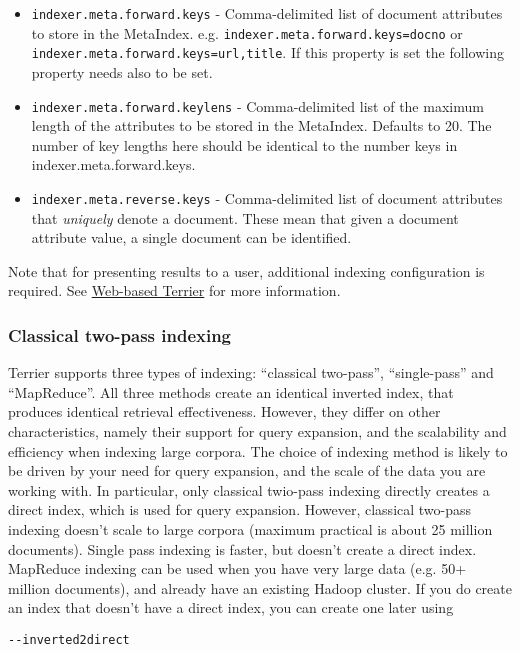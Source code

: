 \begin{itemize}
\tightlist
\item
  \texttt{indexer.meta.forward.keys} - Comma-delimited list of document
  attributes to store in the MetaIndex. e.g.
  \texttt{indexer.meta.forward.keys=docno} or
  \texttt{indexer.meta.forward.keys=url,title}. If this property is set
  the following property needs also to be set.
\item
  \texttt{indexer.meta.forward.keylens} - Comma-delimited list of the
  maximum length of the attributes to be stored in the MetaIndex.
  Defaults to 20. The number of key lengths here should be identical to
  the number keys in indexer.meta.forward.keys.
\item
  \texttt{indexer.meta.reverse.keys} - Comma-delimited list of document
  attributes that \emph{uniquely} denote a document. These mean that
  given a document attribute value, a single document can be identified.
\end{itemize}

Note that for presenting results to a user, additional indexing
configuration is required. See \href{terrier_http.html}{Web-based
Terrier} for more information.

\subsubsection{Classical two-pass
indexing}\label{classical-two-pass-indexing}

Terrier supports three types of indexing: ``classical two-pass'',
``single-pass'' and ``MapReduce''. All three methods create an identical
inverted index, that produces identical retrieval effectiveness.
However, they differ on other characteristics, namely their support for
query expansion, and the scalability and efficiency when indexing large
corpora. The choice of indexing method is likely to be driven by your
need for query expansion, and the scale of the data you are working
with. In particular, only classical twio-pass indexing directly creates
a direct index, which is used for query expansion. However, classical
two-pass indexing doesn't scale to large corpora (maximum practical is
about 25 million documents). Single pass indexing is faster, but doesn't
create a direct index. MapReduce indexing can be used when you have very
large data (e.g. 50+ million documents), and already have an existing
Hadoop cluster. If you do create an index that doesn't have a direct
index, you can create one later using

\begin{verbatim}
--inverted2direct
\end{verbatim}

